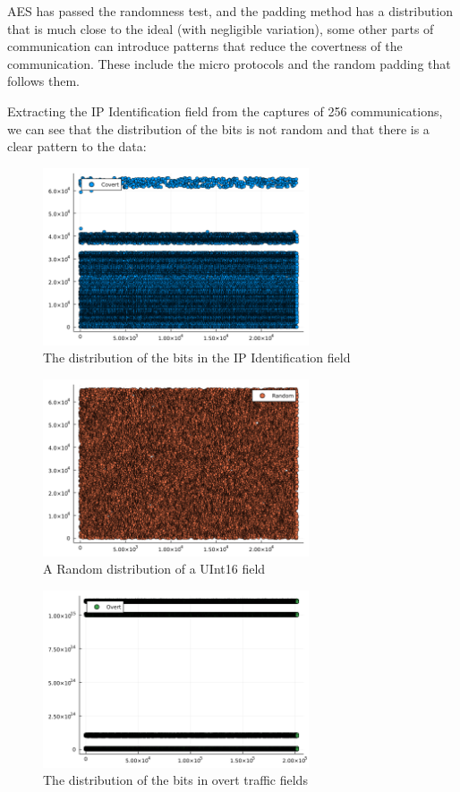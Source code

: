 AES has passed the randomness test, and the padding method has a distribution that is much close to the ideal (with negligible variation), some other parts of communication can introduce patterns that reduce the covertness of the communication. These include the micro protocols and the random padding that follows them.

Extracting the IP Identification field from the captures of 256 communications, we can see that the distribution of the bits is not random and that there is a clear pattern to the data:

\begin{figure}[h]
    \centering
    \includegraphics[width=0.7\textwidth]{fig/covert.png}
    \caption{The distribution of the bits in the IP Identification field}
    \label{fig:Covert_field}
\end{figure}

\begin{figure}[h]
    \centering
    \includegraphics[width=0.7\textwidth]{fig/random.png}
    \caption{A Random distribution of a UInt16 field}
    \label{fig:RandomUInt16}
\end{figure}

\begin{figure}[h]
    \centering
    \includegraphics[width=0.7\textwidth]{fig/overt.png}
    \caption{The distribution of the bits in overt traffic fields}
    \label{fig:overt_field}
\end{figure}

